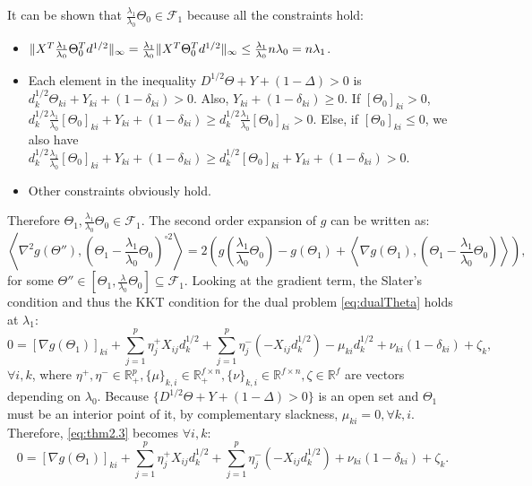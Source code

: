 It can be shown that $\frac{\lambda_1}{\lambda_0}\Theta_{0}\in\mathcal{F}_{1}$ because all the constraints hold:
\begin{itemize}
    \item $\lVert X^T\frac{\lambda_1}{\lambda_0}\Theta_{0}^Td^{1/2}\rVert_\infty=\frac{\lambda_1}{\lambda_0}\lVert X^T\Theta_{0}^Td^{1/2}\rVert_\infty\leq \frac{\lambda_1}{\lambda_0}n\lambda_0=n\lambda_1$.
    \item Each element in the inequality $D^{1/2}\Theta+Y+(1-\Delta)> 0$ is $d_k^{1/2}\Theta_{ki}+Y_{ki}+(1-\delta_{ki})>0$. Also, $Y_{ki}+(1-\delta_{ki})\geq 0$. If $[\Theta_0]_{ki}>0$, $d_k^{1/2}\frac{\lambda_1}{\lambda_0}[\Theta_0]_{ki}+Y_{ki}+(1-\delta_{ki})\geq d_k^{1/2}\frac{\lambda_1}{\lambda_0}[\Theta_0]_{ki}>0.$ Else, if $[\Theta_0]_{ki}\leq0$, we also have $d_k^{1/2}\frac{\lambda_1}{\lambda_0}[\Theta_0]_{ki}+Y_{ki}+(1-\delta_{ki})\geq d_k^{1/2}[\Theta_0]_{ki}+Y_{ki}+(1-\delta_{ki})>0.$
    \item Other constraints obviously hold.
\end{itemize}
Therefore $\Theta_{1},\frac{\lambda_1}{\lambda_0}\Theta_{0}\in \mathcal{F}_{1}$. The second order expansion of $g$ can be written as:
\begin{equation}
    \label{eq:thm2.1}
    \left\langle\nabla^2 g(\Theta''),\left(\Theta_{1}-\frac{\lambda_1}{\lambda_0}\Theta_{0}\right)^{\circ 2}\right\rangle=2\left(g\left(\frac{\lambda_1}{\lambda_0}\Theta_{0}\right)-g(\Theta_{1})+\left\langle\nabla g\left(\Theta_{1}\right),\left(\Theta_{1}-\frac{\lambda_1}{\lambda_0}\Theta_{0}\right)\right\rangle\right),
\end{equation}
 for some $\Theta''\in[\Theta_1,\frac{\lambda}{\lambda_0}\Theta_{0}]\subseteq \mathcal{F}_1$. Looking at the gradient term, the Slater's condition and thus the KKT condition for the dual problem \eqref{eq:dualTheta} holds at $\lambda_1$:
\begin{equation}
    \label{eq:thm2.3}
    0=[\nabla g(\Theta_{1})]_{ki}+\sum_{j=1}^p\eta^+_jX_{ij}d_k^{1/2}+\sum_{j=1}^p\eta^-_j(-X_{ij}d_k^{1/2})-\mu_{ki}d_k^{1/2}+\nu_{ki}(1-\delta_{ki})+\zeta_k,
\end{equation}
$\forall i,k$, where $\eta^+,\eta^-\in\mathbb{R}^p_+,\{\mu\}_{k,i}\in\mathbb{R}^{f\times n}_+,\{\nu\}_{k,i}\in\mathbb{R}^{f\times n},\zeta\in\mathbb{R}^f$ are vectors depending on $\lambda_0$. Because $\{D^{1/2}\Theta+Y+(1-\Delta)>0\}$ is an open set and $\Theta_{1}$ must be an interior point of it, by complementary slackness, $\mu_{ki}=0,\forall k,i$. Therefore, \eqref{eq:thm2.3} becomes $\forall i,k$:
\begin{equation}
    \label{eq:thm2.4}
    0=[\nabla g(\Theta_{1})]_{ki}+\sum_{j=1}^p\eta^+_jX_{ij}d_k^{1/2}+\sum_{j=1}^p\eta^-_j(-X_{ij}d_k^{1/2})+\nu_{ki}(1-\delta_{ki})+\zeta_k.
\end{equation}

